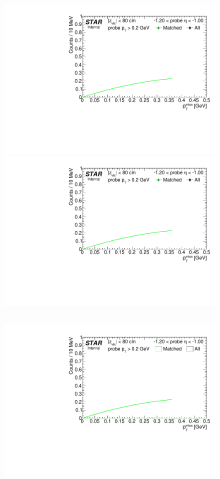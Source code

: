 \begin{figure}
{  \includegraphics[width=\linewidth,page=4]{graphics/systematicsEfficiency/TOF_tagAndProbe/Fitting_effVsEta_data.pdf}\\
  \includegraphics[width=\linewidth,page=5]{graphics/systematicsEfficiency/TOF_tagAndProbe/Fitting_effVsEta_data.pdf}
}~
\parbox{0.495\textwidth}{
  \centering
  \includegraphics[width=\linewidth,page=2]{graphics/systematicsEfficiency/TOF_tagAndProbe/Fitting_effVsEta_mc.pdf}\\
}
\end{figure}
